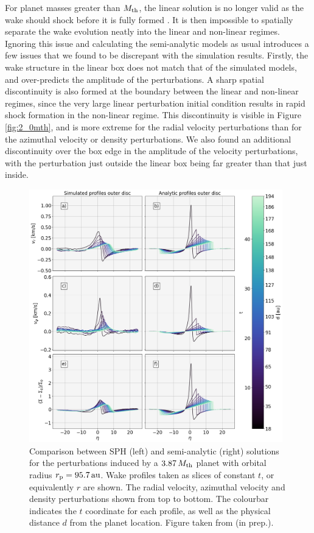 For planet masses greater than $M_{\rm th}$, the linear solution is no longer valid as the wake should shock before it is fully formed \citep{goodman2001}.
It is then impossible to spatially separate the wake evolution neatly into the linear and non-linear regimes.
Ignoring this issue and calculating the semi-analytic models as usual introduces a few issues that we found to be discrepant with the simulation results.
Firstly, the wake structure in the linear box does not match that of the simulated models, and over-predicts the amplitude of the perturbations.
A sharp spatial discontinuity is also formed at the boundary between the linear and non-linear regimes, since the very large linear perturbation initial condition results in rapid shock formation in the non-linear regime.
This discontinuity is visible in Figure \ref{fig:2_0mth}, and is more extreme for the radial velocity perturbations than for the azimuthal velocity or density perturbations.
We also found an additional discontinuity over the box edge in the amplitude of the velocity perturbations, with the perturbation just outside the linear box being far greater than that just inside.

\begin{figure}[H]
    \centering
    \includegraphics[width = 0.98\textwidth]{figures/comp_as_prof_out_high.png}
    \caption{Comparison between SPH (left) and semi-analytic (right) solutions for the perturbations induced by a $3.87 \, M_{\rm th}$ planet with orbital radius $r_{\rm p}=95.7 \, \mathrm{au}$. Wake profiles taken as slices of constant $t$, or equivalently $r$ are shown. The radial velocity, azimuthal velocity and density perturbations shown from top to bottom. The colourbar indicates the $t$ coordinate for each profile, as well as the physical distance $d$ from the planet location. Figure taken from \citeauthor{fasanoinprep.} (in prep.).}
    \label{fig:profile_comparison}
\end{figure}

